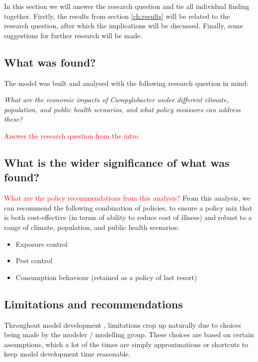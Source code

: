In this section we will answer the research question and tie all individual finding together. Firstly, the results from section \ref{ch:results} will be related to the research question, after which the implications will be discussed. Finally, some suggestions for further research will be made. 

\subsection{What was found?}

The model was built and analysed with the following research question in mind: 

\begin{center}\textit{\textcolor{NiceBlue}{
What are the economic impacts of Campylobacter under different climate, population, and public health scenarios, and what policy measures can address these? }}
\end{center}


\textcolor{red}{Answer the research question from the intro}


\subsection{What is the wider significance of what was found?}
\textcolor{red}{What are the policy recommendations from this analysis?}
From this analysis, we can recommend the following combination of policies, to ensure a policy mix that is both cost-effective (in terms of ability to reduce cost of illness) and robust to a range of climate, population, and public health scenarios:
\begin{itemize}
    \item Exposure control
    \item Pest control
    \item Consumption behaviour (retained as a policy of last resort)
\end{itemize}

\subsection{Limitations and recommendations}

Throughout model development , limitations crop up naturally due to choices being made by the modeler / modelling group. These choices are based on certain assumptions, which a lot of the times are simply approximations or shortcuts to keep model development time reasonable.

